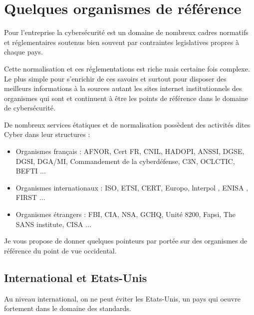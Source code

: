 %
%



\section{Quelques organismes de référence}

Pour l'entreprise la cybersécurité est un domaine  de nombreux cadres normatifs et réglementaires soutenus bien souvent par contraintes legislatives propres à chaque pays.

Cette normalisation et ces réglementations est riche mais certaine fois complexe.
Le plus simple pour s'enrichir de ces savoirs et surtout pour disposer des meilleurs informations à la sources autant  les sites internet institutionnels des organismes qui sont et continuent à être les points de  référence dans le domaine de cybersécurité.

De nombreux services étatiques et de normalisation possèdent des activités dites Cyber dans leur structures :

\begin{itemize}
    \item  Organismes français : AFNOR, Cert FR, CNIL, HADOPI, ANSSI, DGSE, DGSI, DGA/MI, Commandement de la cyberdéfense, C3N, OCLCTIC, BEFTI ...
  \item  Organismes internationaux : ISO, ETSI, CERT, Europo, lnterpol , ENISA , FIRST ...
  \item  Organismes étrangers : FBI, CIA, NSA, GCHQ, Unité 8200, Fapsi, The SANS institute, CISA ...
\end{itemize}

Je vous propose de donner quelques pointeurs par portée sur des organismes de référence du point de vue occidental.

\subsection{International et Etats-Unis}

Au niveau international, on ne peut éviter les Etats-Unis, un pays qui oeuvre fortement dans le domaine des standards.

